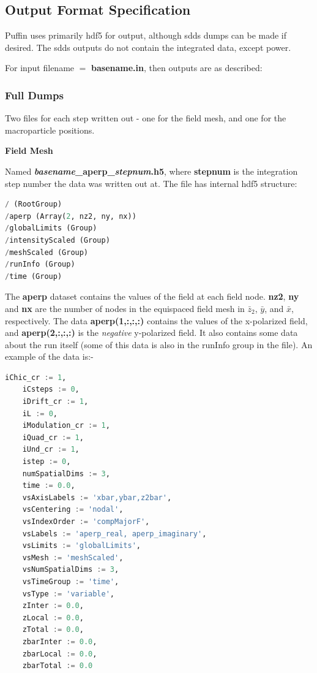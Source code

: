 \documentclass[12pt]{article}%
\begin{document}
\subsection{Output Format Specification}

Puffin uses primarily hdf5 for output, although sdds dumps can be made if desired. The sdds outputs do not contain the integrated data, except power.

For input filename $=$ {\bf basename.in}, then outputs are as described:

\subsubsection{Full Dumps}

Two files for each step written out - one for the field mesh, and one for the macroparticle positions.

{\bf Field Mesh}

Named {\bf \textit{basename}\_aperp\_\textit{stepnum}.h5}, where {\bf stepnum} is the integration step number the data was written out at. The file has internal hdf5 structure:

\begin{lstlisting}[language=python, caption=Structure of HDF5 field output file produced by Puffin]
/ (RootGroup)
/aperp (Array(2, nz2, ny, nx))
/globalLimits (Group)
/intensityScaled (Group)
/meshScaled (Group)
/runInfo (Group)
/time (Group)
\end{lstlisting}

The {\bf aperp} dataset contains the values of the field at each field node. {\bf nz2}, {\bf ny} and {\bf nx} are the number of nodes in the equispaced field mesh in $\bar{z}_2$, $\bar{y}$, and $\bar{x}$, respectively. The data {\bf aperp(1,:,:,:)} contains the values of the x-polarized field, and {\bf aperp(2,:,:,:)} is the \textit{negative} y-polarized field.  It also contains some data about the run itself (some of this data is also in the runInfo group in the file). An example of the data is:-

\begin{lstlisting}[language=python]
    iChic_cr := 1,
    iCsteps := 0,
    iDrift_cr := 1,
    iL := 0,
    iModulation_cr := 1,
    iQuad_cr := 1,
    iUnd_cr := 1,
    istep := 0,
    numSpatialDims := 3,
    time := 0.0,
    vsAxisLabels := 'xbar,ybar,z2bar',
    vsCentering := 'nodal',
    vsIndexOrder := 'compMajorF',
    vsLabels := 'aperp_real, aperp_imaginary',
    vsLimits := 'globalLimits',
    vsMesh := 'meshScaled',
    vsNumSpatialDims := 3,
    vsTimeGroup := 'time',
    vsType := 'variable',
    zInter := 0.0,
    zLocal := 0.0,
    zTotal := 0.0,
    zbarInter := 0.0,
    zbarLocal := 0.0,
    zbarTotal := 0.0
\end{lstlisting}
\end{document}
